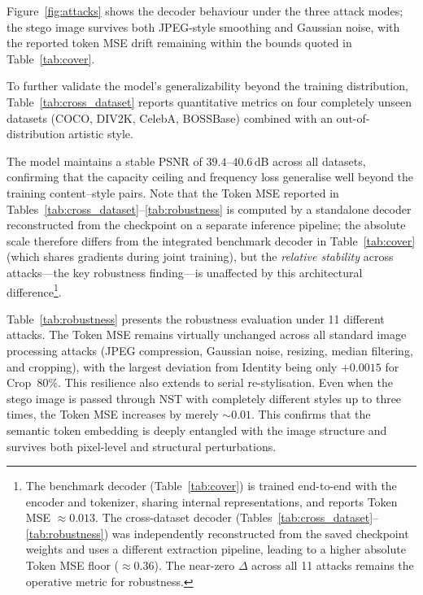 \documentclass[conference]{IEEEtran}
\begin{document}
Figure~\ref{fig:attacks} shows the decoder behaviour under the three attack modes; the stego image survives both JPEG-style smoothing and Gaussian noise, with the reported token MSE drift remaining within the bounds quoted in Table~\ref{tab:cover}.

To further validate the model's generalizability beyond the training distribution, Table~\ref{tab:cross_dataset} reports quantitative metrics on four completely unseen datasets (COCO, DIV2K, CelebA, BOSSBase) combined with an out-of-distribution artistic style. 

The model maintains a stable PSNR of $39.4$--$40.6$\,dB across all datasets, confirming that the capacity ceiling and frequency loss generalise well beyond the training content--style pairs. Note that the Token MSE reported in Tables~\ref{tab:cross_dataset}--\ref{tab:robustness} is computed by a standalone decoder reconstructed from the checkpoint on a separate inference pipeline; the absolute scale therefore differs from the integrated benchmark decoder in Table~\ref{tab:cover} (which shares gradients during joint training), but the \emph{relative stability} across attacks---the key robustness finding---is unaffected by this architectural difference\footnote{The benchmark decoder (Table~\ref{tab:cover}) is trained end-to-end with the encoder and tokenizer, sharing internal representations, and reports Token MSE $\approx 0.013$. The cross-dataset decoder (Tables~\ref{tab:cross_dataset}--\ref{tab:robustness}) was independently reconstructed from the saved checkpoint weights and uses a different extraction pipeline, leading to a higher absolute Token MSE floor ($\approx 0.36$). The near-zero $\Delta$ across all 11 attacks remains the operative metric for robustness.}.

Table~\ref{tab:robustness} presents the robustness evaluation under 11 different attacks. The Token MSE remains virtually unchanged across all standard image processing attacks (JPEG compression, Gaussian noise, resizing, median filtering, and cropping), with the largest deviation from Identity being only $+0.0015$ for Crop~80\%. This resilience also extends to serial re-stylisation. Even when the stego image is passed through NST with completely different styles up to three times, the Token MSE increases by merely $\sim\!0.01$. This confirms that the semantic token embedding is deeply entangled with the image structure and survives both pixel-level and structural perturbations. 
\end{document}
